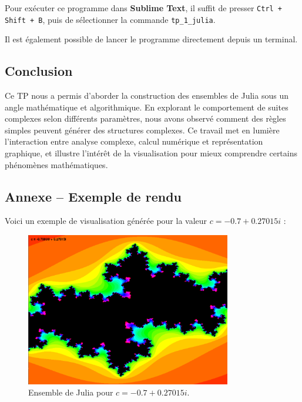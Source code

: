 \documentclass[a4paper,12pt]{article}
\begin{document}
Pour exécuter ce programme dans \textbf{Sublime Text}, il suffit de presser \texttt{Ctrl + Shift + B}, puis de sélectionner la commande \texttt{tp\_1\_julia}.

Il est également possible de lancer le programme directement depuis un terminal.

\subsection*{Conclusion}

Ce TP nous a permis d’aborder la construction des ensembles de Julia sous un angle mathématique et algorithmique. En explorant le comportement de suites complexes selon différents paramètres, nous avons observé comment des règles simples peuvent générer des structures complexes. Ce travail met en lumière l’interaction entre analyse complexe, calcul numérique et représentation graphique, et illustre l’intérêt de la visualisation pour mieux comprendre certains phénomènes mathématiques.

\clearpage

\subsection*{Annexe – Exemple de rendu}

Voici un exemple de visualisation générée pour la valeur \( c = -0.7 + 0.27015i \) :

\begin{figure}[h]
    \centering
    \includegraphics[width=0.8\textwidth]{julia_set_example.png}
    \caption{Ensemble de Julia pour \( c = -0.7 + 0.27015i \).}
    \label{fig:julia_set}
\end{figure}
\end{document}

